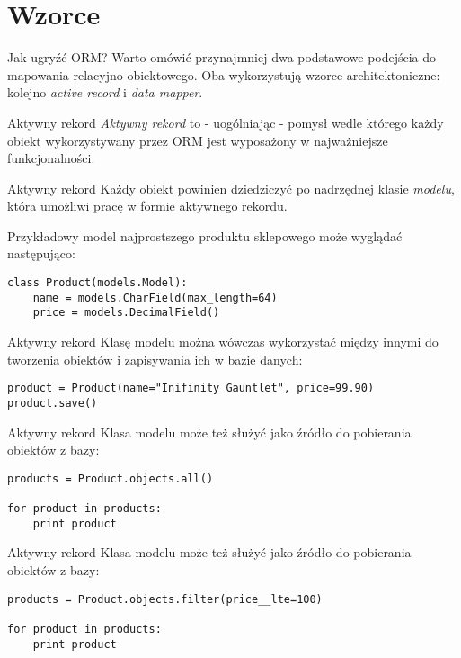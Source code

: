 \section{Wzorce}
	
\begin{frame}{Jak ugryźć ORM?}	
	Warto omówić przynajmniej dwa podstawowe podejścia do mapowania relacyjno-obiektowego. Oba wykorzystują wzorce architektoniczne: kolejno \emph{active record} i \emph{data mapper}.
\end{frame}
	
\begin{frame}{Aktywny rekord}
	\emph{Aktywny rekord} to - uogólniając - pomysł wedle którego każdy obiekt wykorzystywany przez ORM jest wyposażony w najważniejsze funkcjonalności.
\end{frame}

\begin{frame}[fragile]{Aktywny rekord}
	Każdy obiekt powinien dziedziczyć po nadrzędnej klasie \emph{modelu}, która umożliwi pracę w formie aktywnego rekordu. 
	
	Przykładowy model najprostszego produktu sklepowego może wyglądać następująco:

	\begin{lstlisting}	
class Product(models.Model):
    name = models.CharField(max_length=64)
    price = models.DecimalField()
	\end{lstlisting}
\end{frame}

\begin{frame}[fragile]{Aktywny rekord}
	Klasę modelu można wówczas wykorzystać między innymi do tworzenia obiektów i zapisywania ich w bazie danych:
	
	\begin{lstlisting}	
product = Product(name="Inifinity Gauntlet", price=99.90)
product.save()
	\end{lstlisting}
\end{frame}

\begin{frame}[fragile]{Aktywny rekord}
	Klasa modelu może też służyć jako źródło do pobierania obiektów z bazy:
	
	\begin{lstlisting}	
products = Product.objects.all()

for product in products:
    print product
	\end{lstlisting}
\end{frame}

\begin{frame}[fragile]{Aktywny rekord}
	Klasa modelu może też służyć jako źródło do pobierania obiektów z bazy:
	
	\begin{lstlisting}	
products = Product.objects.filter(price__lte=100)

for product in products:
    print product
	\end{lstlisting}
\end{frame}

